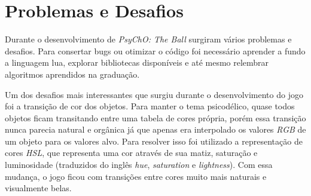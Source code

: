 \section{Problemas e Desafios}
\label{sec:problemas_e_desafios}

Durante o desenvolvimento de \textit{PsyChO: The Ball} surgiram vários problemas e desafios. Para consertar bugs ou otimizar o código foi necessário aprender a fundo a linguagem lua, explorar bibliotecas disponíveis e até mesmo relembrar algoritmos aprendidos na graduação.

Um dos desafios mais interessantes que surgiu durante o desenvolvimento do jogo foi a transição de cor dos objetos. Para manter o tema psicodélico, quase todos objetos ficam transitando entre uma tabela de cores própria, porém essa transição nunca parecia natural e orgânica já que apenas era interpolado os valores \textit{RGB} de um objeto para os valores alvo. Para resolver isso foi utilizado a representação de cores \textit{HSL}, que representa uma cor através de sua matiz, saturação e luminosidade (traduzidos do inglês \textit{hue}, \textit{saturation} e \textit{lightness}). Com essa mudança, o jogo ficou com transições entre cores muito mais naturais e visualmente belas.
